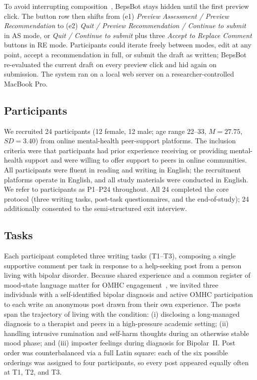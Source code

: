 \documentclass[]{llncs}
\begin{document}
To avoid interrupting composition~\cite{hui2018wakeword}, BepsBot stays 
hidden until the first preview click. The button row then shifts from 
(e1) \textit{Preview Assessment / Preview Recommendation} to (e2) 
\textit{Quit / Preview Recommendation / Continue to submit} in AS mode, 
or \textit{Quit / Continue to submit} plus three \textit{Accept to Replace 
Comment} buttons in RE mode. Participants could iterate freely between 
modes, edit at any point, accept a recommendation in full, or submit the 
draft as written; BepsBot re-evaluated the current draft on every preview 
click and hid again on submission. The system ran on a local web server 
on a researcher-controlled MacBook Pro.

\subsection{Participants}
We recruited 24 participants (12 female, 12 male; age range 22--33, 
$M = 27.75$, $SD = 3.40$) from online mental-health peer-support 
platforms. The inclusion criteria were that participants had prior 
experience receiving or providing mental-health support and were 
willing to offer support to peers in online communities. All 
participants were fluent in reading and writing in English; the 
recruitment platforms operate in English, and all study materials 
were conducted in English. We refer to participants as P1--P24 
throughout. All 24 completed the core protocol (three writing tasks, 
post-task questionnaires, and the end-of-study); 24
additionally consented to the semi-structured exit interview.

\subsection{Tasks}
Each participant completed three writing tasks (T1--T3), composing a 
single supportive comment per task in response to a help-seeking post 
from a person living with bipolar disorder. Because shared experience 
and a common register of mood-state language matter for OMHC 
engagement~\cite{andalibi2018}, we invited three individuals with a 
self-identified bipolar diagnosis and active OMHC participation to 
each write an anonymous post drawn from their own experience. The posts 
span the trajectory of living with the condition: 
(i) disclosing a long-managed diagnosis to a therapist and peers in a 
high-pressure academic setting; 
(ii) handling intrusive rumination and self-harm thoughts during an 
otherwise stable mood phase; and 
(iii) imposter feelings during diagnosis for Bipolar~II. Post order was 
counterbalanced via a full Latin square: each of the six possible 
orderings was assigned to four participants, so every post appeared 
equally often at T1, T2, and T3.
\end{document}
